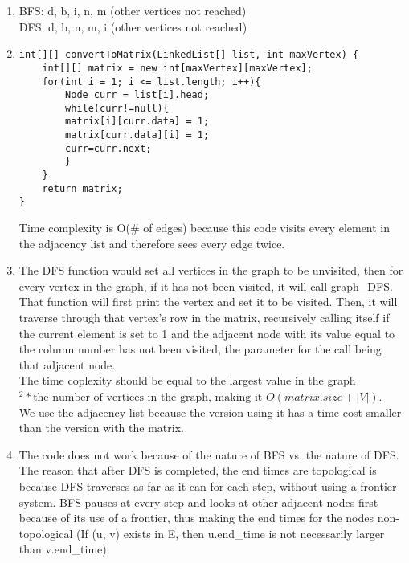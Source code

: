 \documentclass{article}
\begin{document}
\begin{enumerate}
\item BFS: d, b, i, n, m  (other vertices not reached)\\
	DFS: d, b, n, m, i  (other vertices not reached)
\item \begin{lstlisting}
int[][] convertToMatrix(LinkedList[] list, int maxVertex) {
	int[][] matrix = new int[maxVertex][maxVertex];
	for(int i = 1; i <= list.length; i++){
		Node curr = list[i].head;
		while(curr!=null){
		matrix[i][curr.data] = 1;
		matrix[curr.data][i] = 1;
		curr=curr.next;
		}
	}
	return matrix;
}
	\end{lstlisting}
Time complexity is O(\# of edges) because this code visits every element in the adjacency list and therefore sees every edge twice. 
\item The DFS function would set all vertices in the graph to be unvisited, then for every vertex in the graph, if it has not been visited, it will call graph\_DFS. That function will first print the
	vertex and set it to be visited. Then, it will traverse through that vertex's row in the matrix, recursively calling itself if the current element is set to 1 and the adjacent node with its value 			equal to the column number has not been visited, the parameter for the call being that adjacent node.\\
	The time coplexity should be equal to the largest value in the graph\begin{math}^2*\mbox{the number of vertices in the graph, making it }O(matrix.size+|V|)\end{math}.\\
	We use the adjacency list because the version using it has a time cost smaller than the version with the matrix.
\item The code does not work because of the nature of BFS vs. the nature of DFS. The reason that after DFS is completed, the end times are topological is because DFS traverses as far as it can 		for each step, without using a frontier system. BFS pauses at every step and looks at other adjacent nodes first because of its use of a frontier, thus making the end times for the nodes 			non-topological (If (u, v) exists in E, then u.end\_time is not necessarily larger than v.end\_time). 
\end{enumerate}
\end{document}
